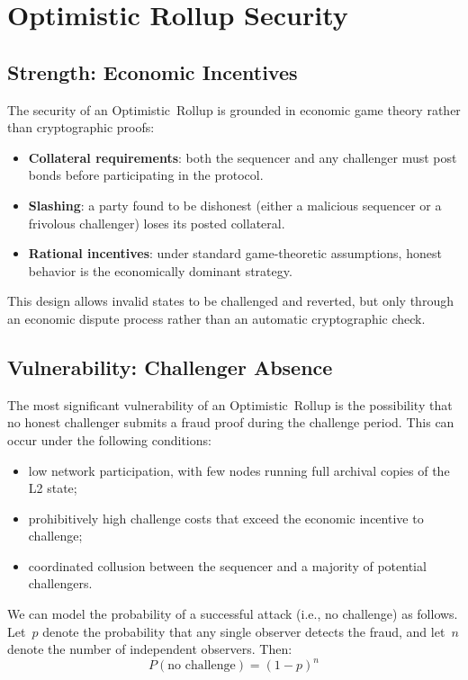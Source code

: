 \section{Optimistic Rollup Security}

\subsection{Strength: Economic Incentives}

The security of an Optimistic~Rollup is grounded in economic game theory rather than cryptographic proofs:
\begin{itemize}
    \item \textbf{Collateral requirements}: both the sequencer and any challenger must post bonds before participating in the protocol.
    \item \textbf{Slashing}: a party found to be dishonest (either a malicious sequencer or a frivolous challenger) loses its posted collateral.
    \item \textbf{Rational incentives}: under standard game-theoretic assumptions, honest behavior is the economically dominant strategy.
\end{itemize}

This design allows invalid states to be challenged and reverted, but only through an economic dispute process rather than an automatic cryptographic check.

\subsection{Vulnerability: Challenger Absence}

The most significant vulnerability of an Optimistic~Rollup is the possibility that no honest challenger submits a fraud proof during the challenge period. This can occur under the following conditions:
\begin{itemize}
    \item low network participation, with few nodes running full archival copies of the L2 state;
    \item prohibitively high challenge costs that exceed the economic incentive to challenge;
    \item coordinated collusion between the sequencer and a majority of potential challengers.
\end{itemize}

We can model the probability of a successful attack (i.e., no challenge) as follows. Let~$p$ denote the probability that any single observer detects the fraud, and let~$n$ denote the number of independent observers. Then:
\begin{equation}
P(\text{no challenge}) = (1 - p)^n
\end{equation}

